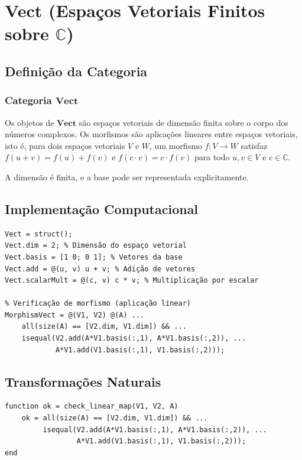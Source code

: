 \section{Vect (Espaços Vetoriais Finitos sobre $\mathbb{C}$)}
\label{sec:vect}

\subsection{Definição da Categoria}

\subsubsection{Categoria $\mathbf{Vect}$}

\begin{definition}
    Os objetos de $\mathbf{Vect}$ são espaços vetoriais de dimensão finita sobre o corpo dos números complexos.
    Os morfismos são aplicações lineares entre espaços vetoriais, isto é, para dois espaços vetoriais $V$ e $W$, um morfismo $f: V \to W$ satisfaz $f(u + v) = f(u) + f(v)$ e $f(c \cdot v) = c \cdot f(v)$ para todo $u, v \in V$ e $c \in \mathbb{C}$.
\end{definition}

\begin{remark}
    A dimensão é finita, e a base pode ser representada explicitamente.
\end{remark}

\subsection{Implementação Computacional}

\begin{lstlisting}[style=matlab]
% Definição de um espaço vetorial
Vect = struct();
Vect.dim = 2; % Dimensão do espaço vetorial
Vect.basis = [1 0; 0 1]; % Vetores da base
Vect.add = @(u, v) u + v; % Adição de vetores
Vect.scalarMult = @(c, v) c * v; % Multiplicação por escalar

% Verificação de morfismo (aplicação linear)
MorphismVect = @(V1, V2) @(A) ...
    all(size(A) == [V2.dim, V1.dim]) && ...
    isequal(V2.add(A*V1.basis(:,1), A*V1.basis(:,2)), ...
            A*V1.add(V1.basis(:,1), V1.basis(:,2)));
\end{lstlisting}

\subsection{Transformações Naturais}
\begin{lstlisting}[style=matlab]
function ok = check_linear_map(V1, V2, A)
    ok = all(size(A) == [V2.dim, V1.dim]) && ...
         isequal(V2.add(A*V1.basis(:,1), A*V1.basis(:,2)), ...
                 A*V1.add(V1.basis(:,1), V1.basis(:,2)));
end
\end{lstlisting}